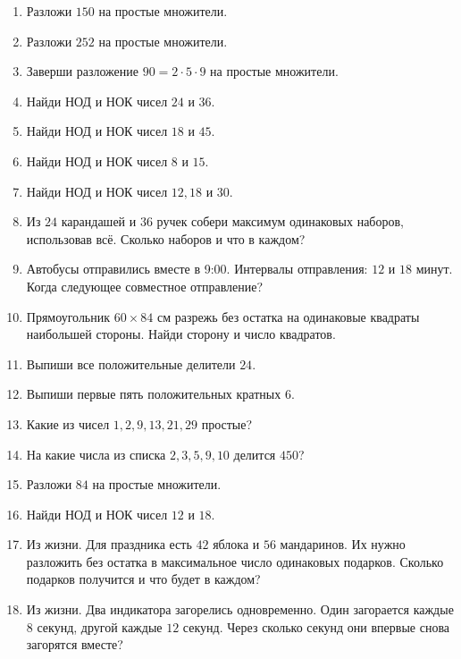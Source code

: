 \documentclass[12pt,a4paper]{article}
\theoremstyle{definition}
\theoremstyle{plain}
\theoremstyle{remark}
\begin{document}
\begin{enumerate}[label=\thesection.\arabic*.,leftmargin=2.8em,itemsep=12pt]
\item Разложи \(150\) на простые множители.
\item Разложи \(252\) на простые множители.
\item Заверши разложение \(90 = 2 \cdot  5 \cdot  9\) на простые множители.
\item Найди НОД и НОК чисел \(24\) и \(36\).
\item Найди НОД и НОК чисел \(18\) и \(45\).
\item Найди НОД и НОК чисел \(8\) и \(15\).
\item Найди НОД и НОК чисел \(12,\allowbreak 18\) и \(30\).
\item Из \(24\) карандашей и \(36\) ручек собери максимум одинаковых наборов, использовав всё. Сколько наборов и что в каждом?
\item Автобусы отправились вместе в 9:00. Интервалы отправления: \(12\) и \(18\) минут. Когда следующее совместное отправление?
\item Прямоугольник \(60 \times  84\) см разрежь без остатка на одинаковые квадраты наибольшей стороны. Найди сторону и число квадратов.
\item Выпиши все положительные делители \(24\).
\item Выпиши первые пять положительных кратных \(6\).
\item Какие из чисел \(1,\allowbreak 2,\allowbreak 9,\allowbreak 13,\allowbreak 21,\allowbreak 29\) простые?
\item На какие числа из списка \(2,\allowbreak 3,\allowbreak 5,\allowbreak 9,\allowbreak 10\) делится \(450\)?
\item Разложи \(84\) на простые множители.
\item Найди НОД и НОК чисел \(12\) и \(18\).
\item Из жизни. Для праздника есть \(42\) яблока и \(56\) мандаринов. Их нужно разложить без остатка в максимальное число одинаковых подарков. Сколько подарков получится и что будет в каждом?
\item Из жизни. Два индикатора загорелись одновременно. Один загорается каждые \(8\) секунд, другой каждые \(12\) секунд. Через сколько секунд они впервые снова загорятся вместе?

\end{enumerate}
\end{document}
